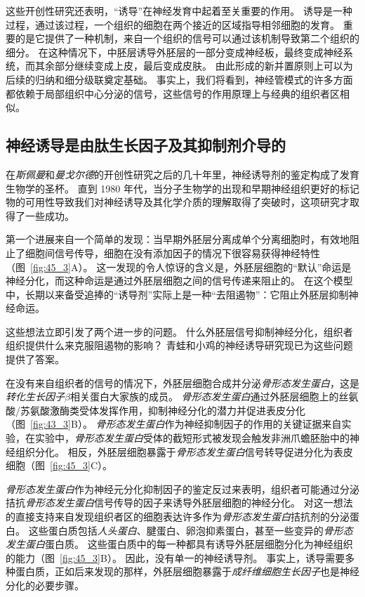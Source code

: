 这些开创性研究还表明，“诱导”在神经发育中起着至关重要的作用。
诱导是一种过程，通过该过程，一个组织的细胞在两个接近的区域指导相邻细胞的发育。
重要的是它提供了一种机制，来自一个组织的信号可以通过该机制导致第二个组织的细分。
在这种情况下，中胚层诱导外胚层的一部分变成神经板，最终变成神经系统，而其余部分继续变成上皮，最后变成皮肤。
由此形成的新并置原则上可以为后续的归纳和细分级联奠定基础。
事实上，我们将看到，神经管模式的许多方面都依赖于局部组织中心分泌的信号，这些信号的作用原理上与经典的组织者区相似。



\subsection{神经诱导是由肽生长因子及其抑制剂介导的}

在\textit{斯佩曼}和\textit{曼戈尔德}的开创性研究之后的几十年里，神经诱导剂的鉴定构成了发育生物学的圣杯。
直到 1980 年代，当分子生物学的出现和早期神经组织更好的标记物的可用性导致我们对神经诱导及其化学介质的理解取得了突破时，这项研究才取得了一些成功。


第一个进展来自一个简单的发现：当早期外胚层分离成单个分离细胞时，有效地阻止了细胞间信号传导，细胞在没有添加因子的情况下很容易获得神经特性（图~\ref{fig:45_3}A）。
这一发现的令人惊讶的含义是，外胚层细胞的“默认”命运是神经分化，而这种命运是通过外胚层细胞之间的信号传递来阻止的。
在这个模型中，长期以来备受追捧的“诱导剂”实际上是一种“去阻遏物”：它阻止外胚层抑制神经命运。


这些想法立即引发了两个进一步的问题。
什么外胚层信号抑制神经分化，组织者组织提供什么来克服阻遏物的影响？
青蛙和小鸡的神经诱导研究现已为这些问题提供了答案。


在没有来自组织者的信号的情况下，外胚层细胞合成并分泌\textit{骨形态发生蛋白}，这是\textit{转化生长因子$\beta$}相关蛋白大家族的成员。
\textit{骨形态发生蛋白}通过外胚层细胞上的丝氨酸/苏氨酸激酶类受体发挥作用，抑制神经分化的潜力并促进表皮分化（图~\ref{fig:43_3}B）。
\textit{骨形态发生蛋白}作为神经抑制因子的作用的关键证据来自实验，在实验中，\textit{骨形态发生蛋白}受体的截短形式被发现会触发非洲爪蟾胚胎中的神经组织分化。
相反，外胚层细胞暴露于\textit{骨形态发生蛋白}信号转导促进分化为表皮细胞（图~\ref{fig:45_3}C）。


\textit{骨形态发生蛋白}作为神经元分化抑制因子的鉴定反过来表明，组织者可能通过分泌拮抗\textit{骨形态发生蛋白}信号传导的因子来诱导外胚层细胞的神经分化。
对这一想法的直接支持来自发现组织者区的细胞表达许多作为\textit{骨形态发生蛋白}拮抗剂的分泌蛋白。
这些蛋白质包括\textit{人头蛋白}、腱蛋白、卵泡抑素蛋白，甚至一些变异的\textit{骨形态发生蛋白}蛋白质。
这些蛋白质中的每一种都具有诱导外胚层细胞分化为神经组织的能力（图~\ref{fig:45_3}B）。
因此，没有单一的神经诱导剂。
事实上，诱导需要多种蛋白质，正如后来发现的那样，外胚层细胞暴露于\textit{成纤维细胞生长因子}也是神经分化的必要步骤。


